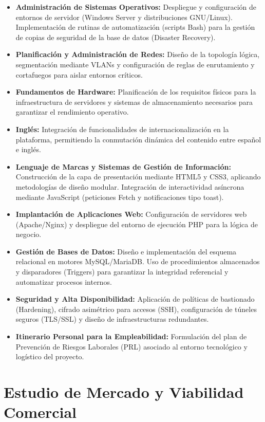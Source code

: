 \documentclass[12pt,a4paper]{article}
\begin{document}
\begin{itemize}
    \item \textbf{Administración de Sistemas Operativos:} Despliegue y configuración de entornos de servidor (Windows Server y distribuciones GNU/Linux). Implementación de rutinas de automatización (scripts Bash) para la gestión de copias de seguridad de la base de datos (Disaster Recovery).
    \item \textbf{Planificación y Administración de Redes:} Diseño de la topología lógica, segmentación mediante VLANs y configuración de reglas de enrutamiento y cortafuegos para aislar entornos críticos.
    \item \textbf{Fundamentos de Hardware:} Planificación de los requisitos físicos para la infraestructura de servidores y sistemas de almacenamiento necesarios para garantizar el rendimiento operativo.
    \item \textbf{Inglés:} Integración de funcionalidades de internacionalización en la plataforma, permitiendo la conmutación dinámica del contenido entre español e inglés.
    \item \textbf{Lenguaje de Marcas y Sistemas de Gestión de Información:} Construcción de la capa de presentación mediante HTML5 y CSS3, aplicando metodologías de diseño modular. Integración de interactividad asíncrona mediante JavaScript (peticiones Fetch y notificaciones tipo toast).
    \item \textbf{Implantación de Aplicaciones Web:} Configuración de servidores web (Apache/Nginx) y despliegue del entorno de ejecución PHP para la lógica de negocio.
    \item \textbf{Gestión de Bases de Datos:} Diseño e implementación del esquema relacional en motores MySQL/MariaDB. Uso de procedimientos almacenados y disparadores (Triggers) para garantizar la integridad referencial y automatizar procesos internos.
    \item \textbf{Seguridad y Alta Disponibilidad:} Aplicación de políticas de bastionado (Hardening), cifrado asimétrico para accesos (SSH), configuración de túneles seguros (TLS/SSL) y diseño de infraestructuras redundantes.
    \item \textbf{Itinerario Personal para la Empleabilidad:} Formulación del plan de Prevención de Riesgos Laborales (PRL) asociado al entorno tecnológico y logístico del proyecto.
\end{itemize}

\newpage
\section{Estudio de Mercado y Viabilidad Comercial}
\label{EstudioMercado}
\end{document}
